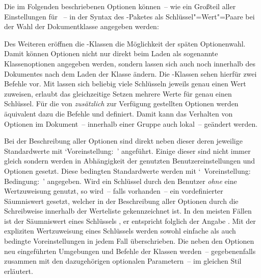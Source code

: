 Die im Folgenden beschriebenen Optionen können~-- wie ein Großteil aller 
Einstellungen für \KOMAScript~-- in der Syntax des -Paketes 
als Schlüssel"=Wert"=Paare bei der Wahl der Dokumentklasse angegeben werden:

Des Weiteren eröffnen die \KOMAScript-Klassen die Möglichkeit der späten 
Optionenwahl. Damit können Optionen nicht nur direkt beim Laden als sogenannte 
Klassenoptionen angegeben werden, sondern lassen sich auch noch innerhalb des 
Dokumentes nach dem Laden der Klasse ändern. Die \KOMAScript-Klassen sehen 
hierfür zwei Befehle vor. Mit 
lassen sich beliebig viele Schlüsseln jeweils genau einen Wert zuweisen, 
 erlaubt das gleichzeitige 
Setzen mehrere Werte für genau einen Schlüssel. Für die von \TUDScript 
\emph{zusätzlich} zur Verfügung gestellten Optionen werden äquivalent dazu die 
Befehle  und 
 definiert. Damit kann das 
Verhalten von Optionen im Dokument~-- innerhalb einer Gruppe auch lokal~-- 
geändert werden.

Bei der Beschreibung aller Optionen sind direkt neben dieser deren jeweilige 
Standardwerte mit \mbox{\enquote*{Voreinstellung: }} angeführt. 
Einige dieser sind nicht immer gleich sondern werden in Abhängigkeit der 
genutzten Benutzereinstellungen und Optionen gesetzt. Diese bedingten 
Standardwerte werden mit 
\mbox{\enquote*{%
  Voreinstellung: \,\textbar\,Bedingung: %
}}
angegeben. Wird ein Schlüssel durch den Benutzer \emph{ohne} eine Wertzuweisung 
genutzt, so wird~-- falls vorhanden~-- ein vordefinierter Säumniswert gesetzt, 
welcher in der Beschreibung aller Optionen durch die~ 
Schreibweise innerhalb der Werteliste gekennzeichnet ist. In den meisten Fällen 
ist der Säumniswert eines Schlüssels , er entspricht folglich der 
Angabe . Mit der expliziten Wertzuweisung eines 
Schlüssels werden sowohl einfache als auch bedingte Voreinstellungen in jedem 
Fall überschrieben. Die neben den Optionen neu eingeführten Umgebungen und 
Befehle der Klassen werden~-- gegebenenfalls zusammen mit den dazugehörigen 
optionalen Parametern~-- im gleichen Stil erläutert.


